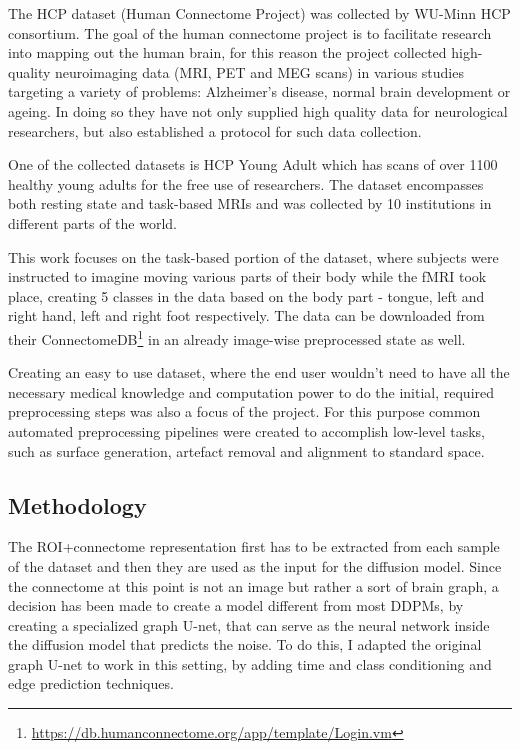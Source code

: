	The HCP dataset (Human Connectome Project) was collected by WU-Minn HCP consortium. The goal of the human connectome project is to facilitate research into mapping	out the human brain, for this reason the project collected high-quality neuroimaging data (MRI, PET and MEG scans) in various studies targeting a variety of problems: Alzheimer's disease, normal brain development or ageing. In doing so they have not only supplied high quality data for neurological researchers, but also established a protocol for such data collection\cite{van2012human}.
	
	One of the collected datasets is HCP Young Adult which has scans of over 1100 healthy young adults for the free use of researchers. The dataset encompasses both resting state and task-based MRIs and was collected by 10 institutions in different parts of the world. 
	
	This work focuses on the task-based portion of the dataset, where subjects were instructed to imagine moving various parts of their body while the fMRI took place, creating 5 classes in the data based on the body part - tongue, left and right hand, left and right foot respectively. The data can be downloaded from their ConnectomeDB\footnote{\url{https://db.humanconnectome.org/app/template/Login.vm}} in an already image-wise preprocessed state as well. 
	
	Creating an easy to use dataset, where the end user wouldn’t need to have all the necessary medical knowledge and computation power to do the initial, required preprocessing steps was also a focus of the project. For this purpose common automated preprocessing pipelines were created to accomplish low-level tasks, such as surface generation, artefact removal and alignment to standard space\cite{glasser2013minimal}.
	
	\subsection{Methodology}
	
	The ROI+connectome representation first has to be extracted from each sample of the dataset and then they are used as the input for the diffusion model. Since the connectome at this point is not an image but rather a sort of brain graph, a decision has been made to create a model different from most DDPMs, by creating a specialized graph U-net, that can serve as the neural network inside the diffusion model that predicts the noise. To do this, I adapted the original graph U-net\cite{graph-u-net} to work in this setting, by adding time and class conditioning and edge prediction techniques.
	

